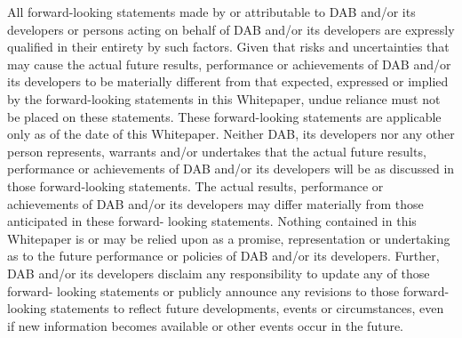 \documentclass[review]{elsarticle}
\begin{document}
All forward-looking statements made by or attributable to DAB and/or its developers or persons acting on behalf of DAB and/or its developers are expressly qualified in their entirety by such factors. Given that risks and uncertainties that may cause the actual future results, performance or achievements of DAB and/or its developers to be materially different from that expected, expressed or implied by the forward-looking statements in this Whitepaper, undue reliance must not be placed on these statements. These forward-looking statements are applicable only as of the date of this Whitepaper. 
Neither DAB, its developers nor any other person represents, warrants and/or undertakes that the actual future results, performance or achievements of DAB and/or its developers will be as discussed in those forward-looking statements. The actual results, performance or achievements of DAB and/or its developers may differ materially from those anticipated in these forward- looking statements. 
Nothing contained in this Whitepaper is or may be relied upon as a promise, representation or undertaking as to the future performance or policies of DAB and/or its developers. 
Further, DAB and/or its developers disclaim any responsibility to update any of those forward- looking statements or publicly announce any revisions to those forward-looking statements to reflect future developments, events or circumstances, even if new information becomes available or other events occur in the future. 
\end{document}
